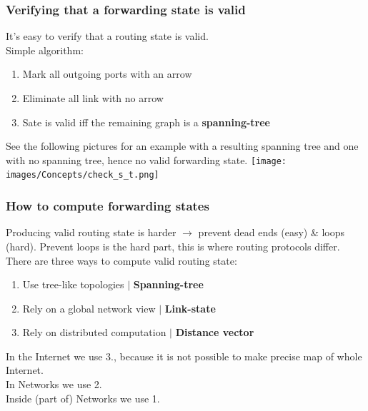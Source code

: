 \documentclass[a4paper, fontsize=8pt, landscape, DIV=1]{scrartcl}
\begin{document}
\begin{multicols*}{4}
		\subsubsection{Verifying that a forwarding state is valid}
		It's easy to verify that a routing state is valid. \\
		Simple algorithm: 
		\vspace{-0.1cm}
		\begin{enumerate}[noitemsep]
			\item Mark all outgoing ports with an arrow
			\item Eliminate all link with no arrow 
			\item Sate is valid iff the remaining graph is a \textbf{spanning-tree}
		\end{enumerate} 
		See the following pictures for an example with a resulting spanning tree and
		one with no spanning tree, hence no valid forwarding state.
		\texttt{[image: images/Concepts/check\_s\_t.png]}
		
		\subsubsection{How to compute forwarding states}\label{kap:How to compute
			forwarding}
		Producing valid routing state is harder $\rightarrow$ prevent dead ends
		(easy) \& loops (hard). Prevent loops is the hard part, this is where routing
		protocols differ. There are three ways to compute valid routing state: 
		\begin{enumerate}[noitemsep]
			\item Use tree-like topologies $\vert$ \textbf{Spanning-tree}
			\item Rely on a global network view $\vert$ \textbf{Link-state}
			\item Rely on distributed computation $\vert$ \textbf{Distance vector} 
		\end{enumerate}
		In the Internet we use 3., because it is not possible to make precise map of
		whole Internet.\\
		In Networks we use 2.\\
		Inside (part of) Networks we use 1. \par
		

\end{multicols*}
\end{document}
